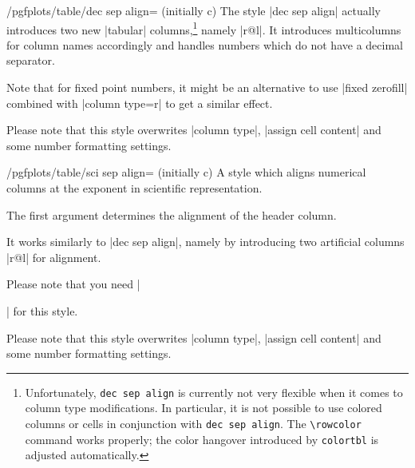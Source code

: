 \documentclass[a4paper]{ltxdoc}
\begin{document}
\begin{stylekey}{/pgfplots/table/dec sep align= (initially c)}
    The style |dec sep align| actually introduces two new |tabular|
    columns,\footnote{Unfortunately, \texttt{dec sep align} is currently not
    very flexible when it comes to column type modifications. In particular, it
    is not possible to use colored columns or cells in conjunction with
    \texttt{dec sep align}. The \texttt{\textbackslash rowcolor} command works
    properly; the color hangover introduced by \texttt{colortbl} is adjusted
    automatically.} namely |r@{}l|. It introduces multicolumns for column
    names accordingly and handles numbers which do not have a decimal
    separator.

    Note that for fixed point numbers, it might be an alternative to use
    |fixed zerofill| combined with |column type=r| to get a similar effect.

    Please note that this style overwrites |column type|, |assign cell content|
    and some number formatting settings.
\end{stylekey}

%

%
%
%

\begin{stylekey}{/pgfplots/table/sci sep align= (initially c)}
    A style which aligns numerical columns at the exponent in scientific
    representation.

    The first argument determines the alignment of the header column.

    It works similarly to |dec sep align|, namely by introducing two
    artificial columns |r@{}l| for alignment.

    Please note that you need |\usepackage{array}| for this style.

    Please note that this style overwrites |column type|, |assign cell content|
    and some number formatting settings.
\end{stylekey}
\end{document}

